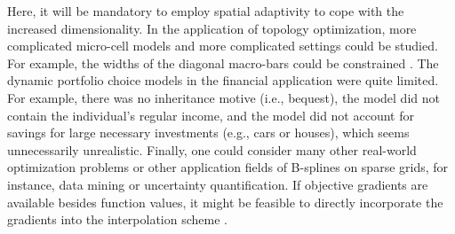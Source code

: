 Here, it will be mandatory to employ spatial adaptivity
to cope with the increased dimensionality.
In the application of topology optimization,
more complicated micro-cell models and more complicated
settings could be studied.
For example, the widths of the diagonal macro-bars could be constrained
\cite{Allaire16Towards}.
The dynamic portfolio choice models in the financial application
were quite limited.
For example,
there was no inheritance motive (i.e., bequest),
the model did not contain the individual's regular income, and
the model did not account for savings for large necessary investments
(e.g., cars or houses), which seems unnecessarily unrealistic.
Finally, one could consider many other real-world optimization problems
or other application fields of B-splines on sparse grids,
for instance, data mining or uncertainty quantification.
If objective gradients are available besides function values,
it might be feasible to directly incorporate the gradients into
the interpolation scheme \cite{Baar15Gradient}.


  
  
  
  
  
  
  
  
